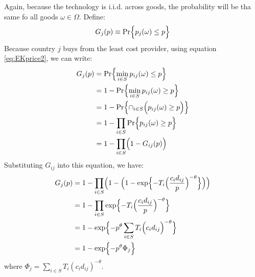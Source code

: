 Again, because the technology is i.i.d. across goods, the probability will be tha same fo all goods $\omega \in \Omega$.
Define:
\begin{gather}
    G_j(p) \equiv \operatorname{Pr} \Bigl\{ p_j(\omega) \leq p \Bigr\}
\end{gather}
Because country $j$ buys from the least cost provider, using equation \ref{eq:EKprice2}, we can write:
\begin{align*}
    G_j(p) &= \operatorname{Pr} \Bigl\{ \min_{i \in S} p_{ij}(\omega) \leq p \Bigr\} \\
    &= 1 - \operatorname{Pr} \Bigl\{ \min_{i \in S} p_{ij}(\omega) \geq p \Bigr\} \\
    &= 1 - \operatorname{Pr} \Bigl\{ \cap_{i \in S} \Bigl( p_{ij}(\omega) \geq p \Bigr) \Bigr\} \\
    &= 1 - \prod_{i \in S} \operatorname{Pr} \Bigl\{ p_{ij}(\omega) \geq p \Bigr\} \\
    &= 1 - \prod_{i \in S} \Bigl( 1 - G_{ij}(p) \Bigr)
\end{align*}
Substituting $G_{ij}$ into this equation, we have:
\begin{align*}
    G_j(p) &= 1 - \prod_{i \in S} \Bigl( 1 - \Bigl( 1 - \exp \Bigl\{ -T_i \Bigl( \frac{c_i d_{ij}}{p} \Bigr)^{-\theta} \Bigr\} \Bigr) \Bigr) \\
    &= 1 - \prod_{i \in S} \exp \Bigl\{ -T_i \Bigl( \frac{c_i d_{ij}}{p} \Bigr)^{-\theta} \Bigr\} \\
    &= 1 - \exp \Bigl\{ -p^{\theta} \sum_{i \in S} T_i \Bigl( c_i d_{ij} \Bigr)^{-\theta} \Bigr\} \\
    &= 1 - \exp \Bigl\{-p^{\theta} \Phi_j \Bigr\}
\end{align*}
where $\Phi_j = \sum_{i \in S} T_i (c_i d_{ij})^{-\theta}$. 

